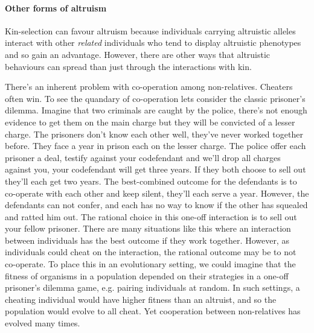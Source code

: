 


\paragraph{Other forms of altruism}
Kin-selection can favour altruism because individuals carrying
altruistic alleles interact with other \emph{ related} individuals who tend to display altruistic phenotypes and so gain an advantage. However, there are other ways that altruistic behaviours can spread than just through the interactions with kin.

There's an inherent problem with co-operation among
non-relatives. Cheaters often win.  To see the quandary of
co-operation lets consider the classic prisoner's dilemma. Imagine
that two criminals are caught by the police, there's not enough
evidence to get them on the main charge but they will be convicted of
a lesser charge. The prisoners don't know each other well, they've
never worked together before. They face a year in prison each on the lesser charge. The police offer each prisoner a deal, testify against your codefendant and we'll drop all charges against you, your codefendant will get three years.  If they both choose to sell out they'll each get two years. The best-combined outcome for the defendants is to co-operate with each other and keep silent, they'll each serve a year. However, the defendants can not confer, and each has no way to know if the other has squealed and ratted him out. The rational choice in this one-off interaction is to sell out your fellow prisoner. There are many situations like this where an interaction between individuals has the best outcome if they work together. However, as individuals could cheat on the interaction, the rational outcome may be to not co-operate. To place this in an evolutionary setting, we could imagine that the fitness of organisms in a population depended on their strategies in a one-off prisoner's dilemma game, e.g. pairing individuals at random. In such settings, a cheating individual would have higher fitness than an altruist, and so the population would evolve to all cheat.  Yet cooperation between non-relatives has evolved many times. 


